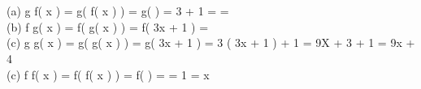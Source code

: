  \\

  \\
(a) \mspace{9mu} g \circ f\left( x \right) = g\left( f\left( x \right) \right) = g\left( \right) = 3 \cdot {} + 1 = =  \\

(b) \mspace{9mu} f \circ g\left( x \right) = f\left( g\left( x \right) \right) = f\left( 3x + 1 \right) =  \\

(c) \mspace{9mu} g \circ g\left( x \right) = g\left( g\left( x \right) \right) = g\left( 3x + 1 \right) = 3 \cdot \left( 3x + 1 \right) + 1 = 9X + 3 + 1 = 9x + 4 \\

(c) \mspace{9mu} f \circ f\left( x \right) = f\left( f\left( x \right) \right) = f\left( \right) =  = 1 \cdot {} = x \\
